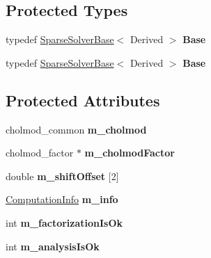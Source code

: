 \subsection*{Protected Types}
\begin{DoxyCompactItemize}
\item 
\mbox{\label{class_eigen_1_1_cholmod_base_adc81958ef5452be2c4acb39a46fa057c}} 
typedef \hyperlink{group___sparse_core___module_class_eigen_1_1_sparse_solver_base}{Sparse\+Solver\+Base}$<$ Derived $>$ {\bfseries Base}
\item 
\mbox{\label{class_eigen_1_1_cholmod_base_adc81958ef5452be2c4acb39a46fa057c}} 
typedef \hyperlink{group___sparse_core___module_class_eigen_1_1_sparse_solver_base}{Sparse\+Solver\+Base}$<$ Derived $>$ {\bfseries Base}
\end{DoxyCompactItemize}
\subsection*{Protected Attributes}
\begin{DoxyCompactItemize}
\item 
\mbox{\label{class_eigen_1_1_cholmod_base_a160c7925c7d7272b721b7c5c715403db}} 
cholmod\+\_\+common {\bfseries m\+\_\+cholmod}
\item 
\mbox{\label{class_eigen_1_1_cholmod_base_a717cfaca704cdee427c9a0a017093448}} 
cholmod\+\_\+factor $\ast$ {\bfseries m\+\_\+cholmod\+Factor}
\item 
\mbox{\label{class_eigen_1_1_cholmod_base_a8b42dc964379a9a16100a8c4602136c5}} 
double {\bfseries m\+\_\+shift\+Offset} \mbox{[}2\mbox{]}
\item 
\mbox{\label{class_eigen_1_1_cholmod_base_a438be23d40a87065edd187a269c1853d}} 
\hyperlink{group__enums_ga85fad7b87587764e5cf6b513a9e0ee5e}{Computation\+Info} {\bfseries m\+\_\+info}
\item 
\mbox{\label{class_eigen_1_1_cholmod_base_a4618b21b4c72f33d078124e6959446ea}} 
int {\bfseries m\+\_\+factorization\+Is\+Ok}
\item 
\mbox{\label{class_eigen_1_1_cholmod_base_abb97dcccd90c5e529c6708005cc084cd}} 
int {\bfseries m\+\_\+analysis\+Is\+Ok}
\end{DoxyCompactItemize}


